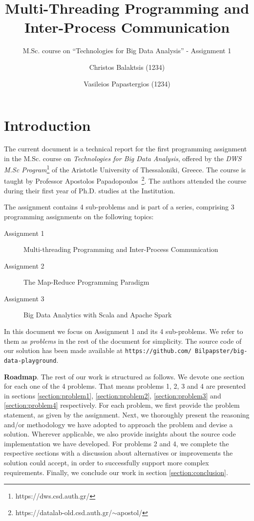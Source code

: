 \documentclass[acmlarge]{acmart}
\begin{document}
\title{Multi-Threading Programming and Inter-Process Communication}
\subtitle{M.Sc. course on ``Technologies for Big Data Analysis'' - Assignment 1}

\author{Christos Balaktsis (1234)}
\author{Vasileios Papastergios (1234)}

\renewcommand{\shortauthors}{C. Balaktsis and V. Papastergios}
\maketitle

\section{Introduction}

The current document is a technical report for the first programming assignment in the M.Sc. course on \emph{Technologies for Big Data Analysis}, offered by the \emph{DWS M.Sc Program}\footnote{https://dws.csd.auth.gr/} of the Aristotle University of Thessaloniki, Greece. The course is taught by Professor Apostolos Papadopoulos~\footnote{https://datalab-old.csd.auth.gr/$\sim$apostol/}. The authors attended the course during their first year of Ph.D. studies at the Institution.

The assignment contains 4 sub-problems and is part of a series, comprising 3 programming assignments on the following topics:
\begin{description}
  \item[Assignment 1] Multi-threading Programming and Inter-Process Communication
  \item[Assignment 2] The Map-Reduce Programming Paradigm
  \item[Assignment 3] Big Data Analytics with Scala and Apache Spark
\end{description}
In this document we focus on Assignment 1 and its 4 sub-problems. We refer to them as \emph{problems} in the rest of the document for simplicity. The source code of our solution has been made available at \texttt{\small https://github.com/ Bilpapster/big-data-playground}.

\textbf{Roadmap}.
The rest of our work is structured as follows. We devote one section for each one of the 4 problems. That means problems 1, 2, 3 and 4 are presented in sections \ref{section:problem1}, \ref{section:problem2}, \ref{section:problem3} and \ref{section:problem4} respectively. For each problem, we first provide the problem statement, as given by the assignment. Next, we thoroughly present the reasoning and/or methodology we have adopted to approach the problem and devise a solution. Wherever applicable, we also provide insights about the source code implementation we have developed. For problems 2 and 4, we complete the respective sections with a discussion about alternatives or improvements the solution could accept, in order to successfully support more complex requirements. Finally, we conclude our work in section \ref{section:conclusion}.
\end{document}
